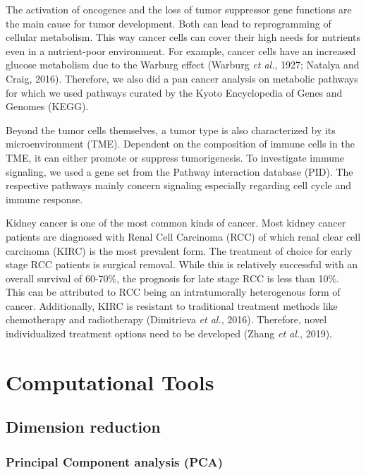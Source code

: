 \documentclass[
  parskip,
  oneside]{scrreprt}
\begin{document}
The activation of oncogenes and the loss of tumor suppressor gene
functions are the main cause for tumor development. Both can lead to
reprogramming of cellular metabolism. This way cancer cells can cover
their high needs for nutrients even in a nutrient-poor environment. For
example, cancer cells have an increased glucose metabolism due to the
Warburg effect (Warburg \emph{et al.}, 1927; Natalya and Craig, 2016).
Therefore, we also did a pan cancer analysis on metabolic pathways for
which we used pathways curated by the Kyoto Encyclopedia of Genes and
Genomes (KEGG).

Beyond the tumor cells themselves, a tumor type is also characterized by
its microenvironment (TME). Dependent on the composition of immune cells
in the TME, it can either promote or suppress tumorigenesis. To
investigate immune signaling, we used a gene set from the Pathway
interaction database (PID). The respective pathways mainly concern
signaling especially regarding cell cycle and immune response.

Kidney cancer is one of the most common kinds of cancer. Most kidney
cancer patients are diagnosed with Renal Cell Carcinoma (RCC) of which
renal clear cell carcinoma (KIRC) is the most prevalent form. The
treatment of choice for early stage RCC patients is surgical removal.
While this is relatively successful with an overall survival of 60-70\%,
the prognosis for late stage RCC is less than 10\%. This can be
attributed to RCC being an intratumorally heterogenous form of cancer.
Additionally, KIRC is resistant to traditional treatment methods like
chemotherapy and radiotherapy (Dimitrieva \emph{et al.}, 2016).
Therefore, novel individualized treatment options need to be developed
(Zhang \emph{et al.}, 2019).

\hypertarget{computational-tools}{%
\section{Computational Tools}\label{computational-tools}}

\hypertarget{dimension-reduction}{%
\subsection{Dimension reduction}\label{dimension-reduction}}

\hypertarget{principal-component-analysis-pca}{%
\subsubsection{Principal Component analysis
(PCA)}\label{principal-component-analysis-pca}}
\end{document}
